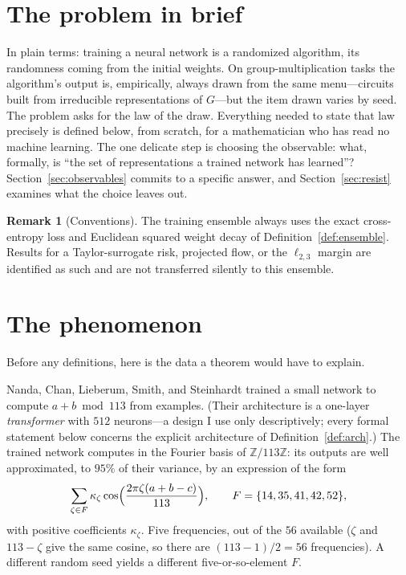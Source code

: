 \documentclass[11pt]{amsart}
\theoremstyle{plain}
\theoremstyle{definition}
\newtheorem{remark}[theorem]{Remark}
\newcommand{\Z}{\mathbb{Z}}
\begin{document}
\section{The problem in brief}



In plain terms: training a neural network is a randomized algorithm, its randomness coming from the initial weights. On group-multiplication tasks the algorithm's output is, empirically, always drawn from the same menu---circuits built from irreducible representations of $G$---but the item drawn varies by seed. The problem asks for the law of the draw. Everything needed to state that law precisely is defined below, from scratch, for a mathematician who has read no machine learning. The one delicate step is choosing the observable: what, formally, is ``the set of representations a trained network has learned''? Section~\ref{sec:observables} commits to a specific answer, and Section~\ref{sec:resist} examines what the choice leaves out.

\begin{remark}[Conventions]
The training ensemble always uses the exact cross-entropy loss and Euclidean squared weight decay of Definition~\ref{def:ensemble}. Results for a Taylor-surrogate risk, projected flow, or the $\ell_{2,3}$ margin are identified as such and are not transferred silently to this ensemble.
\end{remark}

\section{The phenomenon}\label{sec:phenomenon}

Before any definitions, here is the data a theorem would have to explain.

Nanda, Chan, Lieberum, Smith, and Steinhardt \cite{nanda2023} trained a small network to compute $a+b \bmod 113$ from examples. (Their architecture is a one-layer \emph{transformer} with $512$ neurons---a design I use only descriptively; every formal statement below concerns the explicit architecture of Definition~\ref{def:arch}.) The trained network computes in the Fourier basis of $\Z/113\Z$: its outputs are well approximated, to $95\%$ of their variance, by an expression of the form
\[
   \sum_{\zeta \in F} \kappa_\zeta \cos\Bigl(\frac{2\pi \zeta (a+b-c)}{113}\Bigr),
   \qquad F = \{14, 35, 41, 42, 52\},
\]
with positive coefficients $\kappa_\zeta$. Five frequencies, out of the $56$ available ($\zeta$ and $113 - \zeta$ give the same cosine, so there are $(113-1)/2 = 56$ frequencies). A different random seed yields a different five-or-so-element $F$.
\end{document}
